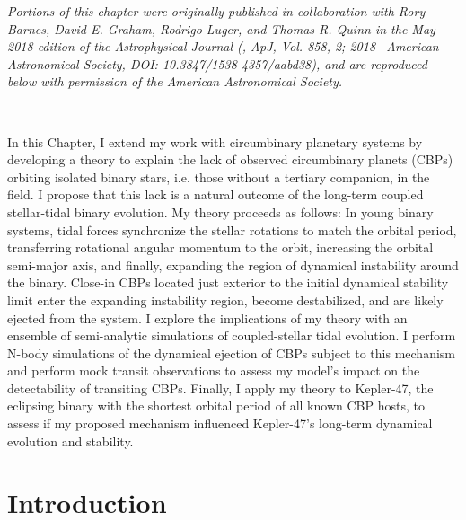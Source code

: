 \textit{Portions of this chapter were originally published in collaboration with Rory Barnes, David E. Graham, Rodrigo Luger, and Thomas R. Quinn in the May 2018 edition of the Astrophysical Journal (\citet{Fleming2018}, ApJ, Vol. 858, 2; 2018 \textcopyright \ American Astronomical Society, DOI: 10.3847/1538-4357/aabd38), and are reproduced below with permission of the American Astronomical Society.}

\

In this Chapter, I extend my work with circumbinary planetary systems by developing a theory to explain the lack of observed circumbinary planets (CBPs) orbiting isolated binary stars, i.e. those without a tertiary companion, in the \kepler field. I propose that this lack is a natural outcome of the long-term coupled stellar-tidal binary evolution. My theory proceeds as follows:  In young binary systems, tidal forces synchronize the stellar rotations to match the orbital period, transferring rotational angular momentum to the orbit, increasing the orbital semi-major axis, and finally, expanding the region of dynamical instability around the binary.  Close-in CBPs located just exterior to the initial dynamical stability limit enter the expanding instability region, become destabilized, and are likely ejected from the system.  I explore the implications of my theory with an ensemble of semi-analytic simulations of coupled-stellar tidal evolution. I perform N-body simulations of the dynamical ejection of CBPs subject to this mechanism and perform mock transit observations to assess my model's impact on the detectability of transiting CBPs. Finally, I apply my theory to Kepler-47, the \kepler eclipsing binary with the shortest orbital period of all known CBP hosts, to assess if my proposed mechanism influenced Kepler-47's long-term dynamical evolution and stability.


\section{Introduction} \label{STEEP:sec:intro}


